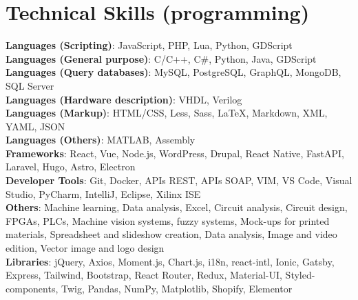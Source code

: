 \documentclass[letterpaper,11pt]{article}
\begin{document}
\section{Technical Skills (programming)}
 \begin{itemize}[leftmargin=0.15in, label={}]
    \small{\item{
     \textbf{Languages (Scripting)}{: JavaScript, PHP, Lua, Python, GDScript} \\
     \textbf{Languages (General purpose)}{: C/C++, C\#, Python, Java, GDScript} \\
     \textbf{Languages (Query databases)}{: MySQL, PostgreSQL, GraphQL, MongoDB, SQL Server} \\
     \textbf{Languages (Hardware description)}{: VHDL, Verilog} \\
     \textbf{Languages (Markup)}{: HTML/CSS, Less, Sass, LaTeX, Markdown, XML, YAML, JSON} \\
     \textbf{Languages (Others)}{: MATLAB, Assembly} \\
     \textbf{Frameworks}{: React, Vue, Node.js, WordPress, Drupal, React Native, FastAPI, Laravel, Hugo, Astro, Electron} \\
     \textbf{Developer Tools}{: Git, Docker, APIs REST, APIs SOAP, VIM, VS Code, Visual Studio, PyCharm, IntelliJ, Eclipse, Xilinx ISE} \\
     \textbf{Others}{: Machine learning, Data analysis, Excel, Circuit analysis, Circuit design, FPGAs, PLCs, Machine vision systems, fuzzy systems, Mock-ups for printed materials, Spreadsheet and slideshow creation, Data analysis, Image and video edition, Vector image and logo design} \\
     \textbf{Libraries}{: jQuery, Axios, Moment.js, Chart.js, i18n, react-intl, Ionic, Gatsby, Express, Tailwind, Bootstrap, React Router, Redux, Material-UI, Styled-components, Twig, Pandas, NumPy, Matplotlib, Shopify, Elementor}
    }}
 \end{itemize}

\end{document}
